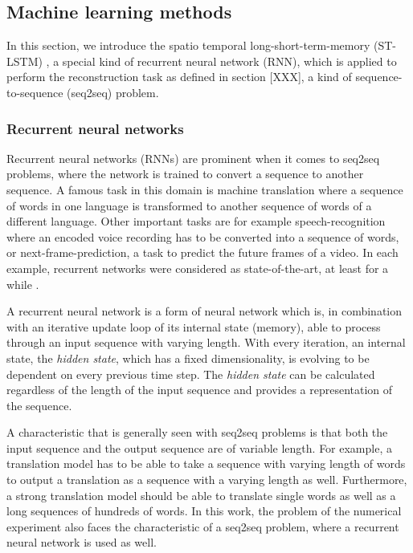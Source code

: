 \subsection{Machine learning methods}\label{sec:model}
In this section, we introduce the spatio temporal long-short-term-memory (ST-LSTM) \cite{stlstm}, a special kind of recurrent neural network (RNN), which is applied to perform the reconstruction task as defined in section [XXX], a kind of sequence-to-sequence (seq2seq) problem.

\subsubsection{Recurrent neural networks}
Recurrent neural networks (RNNs) are prominent when it comes to seq2seq problems, where the network is trained to convert a sequence to another sequence. A famous task in this domain is machine translation where a sequence of words in one language is transformed to another sequence of words of a different language. Other important tasks are for example speech-recognition where an encoded voice recording has to be converted into a sequence of words, or next-frame-prediction, a task to predict the future frames of a video. In each example, recurrent networks were considered as state-of-the-art, at least for a while \cite{seq2seq_example1} \cite{seq2seq_example2} \cite{seq2seq_example3}.

A recurrent neural network is a form of neural network which is, in combination with an iterative update loop of its internal state (memory), able to process through an input sequence with varying length. With every iteration, an internal state, the \textit{hidden state}, which has a fixed dimensionality, is evolving to be dependent on every previous time step. The \textit{hidden state} can be calculated regardless of the length of the input sequence and provides a representation of the sequence.

A characteristic that is generally seen with seq2seq problems is that both the input sequence and the output sequence are of variable length. For example, a translation model has to be able to take a sequence with varying length of words to output a translation as a sequence with a varying length as well. Furthermore, a strong translation model should be able to translate single words as well as a long sequences of hundreds of words. In this work, the problem of the numerical experiment also faces the characteristic of a seq2seq problem, where a recurrent neural network is used as well.

